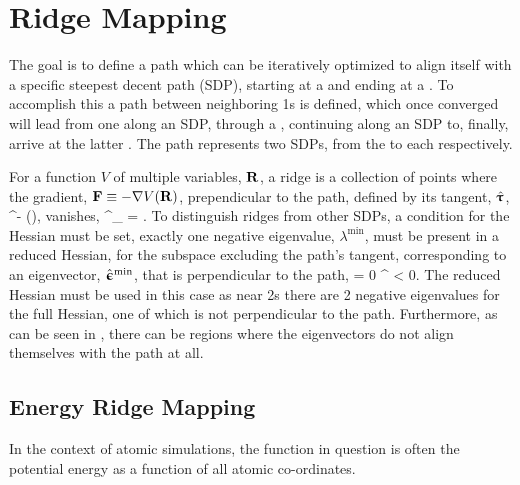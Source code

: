 \section{Ridge Mapping}
The goal is to define a path which can be iteratively optimized to align itself with a specific steepest decent path (SDP),
starting at a  and ending at a .
To accomplish this a path between neighboring \sap1s is defined,
which once converged will lead from one  along an SDP,
through a ,
continuing along an SDP to, finally, arrive at the latter .
The path represents two SDPs, from the  to each  respectively.

For a function $V$ of multiple variables, ${\mathrm{\mathbf{\bm{R}}}}$, a ridge is a collection of points where the gradient, ${\mathrm{\mathbf{\bm{F}}}} \equiv -\nabla V({\mathrm{\mathbf{\bm{R}}}})$, prependicular to the path, defined by its tangent, $\hat{{\mathrm{\mathbf{\bm{\uptau}}}}}$,
\beq
\vF^\perp \equiv \vF - (\vF \cdot \uvt)\uvt,
\eeq
vanishes,
\beq
\vF^\perp_ = .
\eeq
To distinguish ridges from other SDPs,
a condition for the Hessian must be set,
exactly one negative eigenvalue, $\lambda^\text{min}$, must be present in a reduced Hessian, for the subspace excluding the path's tangent,
corresponding to an eigenvector, $\hat{{\mathrm{\mathbf{\bm{\upepsilon}}}}}^\text{min}$, that is perpendicular to the path,
\beq
\uvm \cdot \uvt = 0 \quad {} \quad \lambda^ < 0.
\eeq
The reduced Hessian must be used in this case as near \sap2s there are 2 negative eigenvalues for the full Hessian, one of which is not perpendicular to the path.
Furthermore, as can be seen in , there can be regions where the eigenvectors do not align themselves with the path at all.



\incomplete

\subsection{Energy Ridge Mapping}
In the context of atomic simulations, the function in question is often the potential energy as a function of all atomic co-ordinates.

\incomplete

